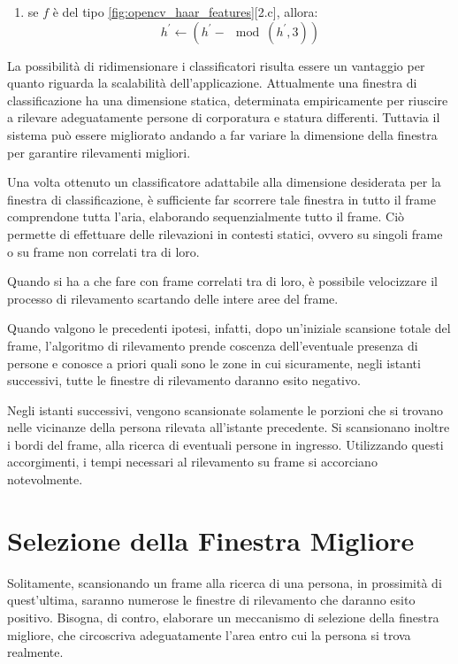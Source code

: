 \begin{enumerate}
\begin{enumerate}
\begin{enumerate}
                    \item se $f$ è del tipo \ref{fig:opencv_haar_features}[2.c], allora:
                    \begin{equation}
                        h^{'} \leftarrow (h^{'} - \mod(h^{'}, 3))
                    \end{equation}
                \end{enumerate}
             \end{enumerate} 
        \end{enumerate}

        La possibilità di ridimensionare i classificatori risulta essere un vantaggio per quanto riguarda la scalabilità dell'applicazione.
        Attualmente una finestra di classificazione ha una dimensione statica, determinata empiricamente per riuscire a rilevare adeguatamente persone di corporatura e statura differenti.
        Tuttavia il sistema può essere migliorato andando a far variare la dimensione della finestra per garantire rilevamenti migliori.

        Una volta ottenuto un classificatore adattabile alla dimensione desiderata per la finestra di classificazione, è sufficiente far scorrere tale finestra in tutto il frame comprendone tutta l'aria, elaborando sequenzialmente tutto il frame.
        Ciò permette di effettuare delle rilevazioni in contesti statici, ovvero su singoli frame o su frame non correlati tra di loro.

        Quando si ha a che fare con frame correlati tra di loro, è possibile velocizzare il processo di rilevamento scartando delle intere aree del frame.

        Quando valgono le precedenti ipotesi, infatti, dopo un'iniziale scansione totale del frame, l'algoritmo di rilevamento prende coscenza dell'eventuale presenza di persone e conosce a priori quali sono le zone in cui sicuramente, negli istanti successivi, tutte le finestre di rilevamento daranno esito negativo.

        Negli istanti successivi, vengono scansionate solamente le porzioni che si trovano nelle vicinanze della persona rilevata all'istante precedente.
        Si scansionano inoltre i bordi del frame, alla ricerca di eventuali persone in ingresso.
        Utilizzando questi accorgimenti, i tempi necessari al rilevamento su frame si accorciano notevolmente.


    \section{Selezione della Finestra Migliore}
    \label{sec:best_detection_window}
        Solitamente, scansionando un frame alla ricerca di una persona, in prossimità di quest'ultima, saranno numerose le finestre di rilevamento che daranno esito positivo.
        Bisogna, di contro, elaborare un meccanismo di selezione della finestra migliore, che circoscriva adeguatamente l'area entro cui la persona si trova realmente.

